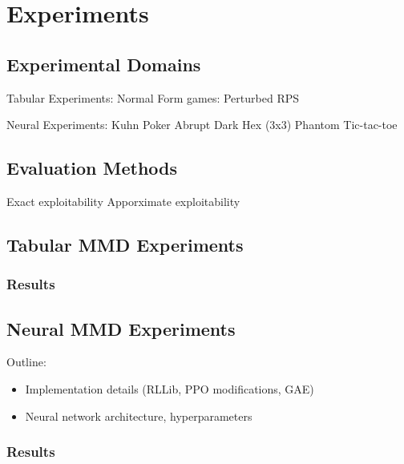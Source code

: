 \chapter{Experiments}

\section{Experimental Domains}

Tabular Experiments:
Normal Form games: Perturbed RPS

Neural Experiments:
Kuhn Poker
Abrupt Dark Hex (3x3)
Phantom Tic-tac-toe

\section{Evaluation Methods}

Exact exploitability
Apporximate exploitability

\section{Tabular MMD Experiments}


\subsection{Results}

\section{Neural MMD Experiments}
Outline:
\begin{itemize}
    \item Implementation details (RLLib, PPO modifications, GAE)
    \item Neural network architecture, hyperparameters
\end{itemize}


\subsection{Results}

